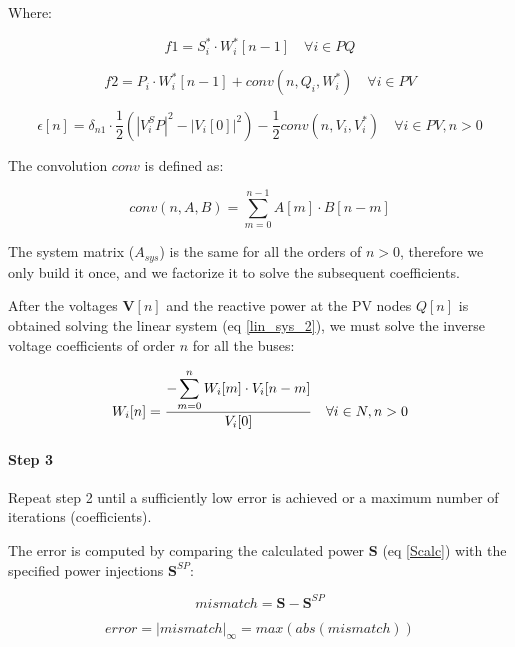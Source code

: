 \documentclass[a4paper,twoside,fleqn]{tufte-book}
\begin{document}
Where:

\begin{equation}
f1 = S^*_i \cdot W^*_i[n-1] \quad \forall i \in PQ
\end{equation}

\begin{equation}
f2 = P_i \cdot W^*_i[n-1] + conv(n, Q_i, W^*_i) \quad \forall i \in PV
\end{equation}

\begin{equation}
\epsilon[n] = \delta_{n1} \cdot \frac{1}{2} \left(|V_i^SP|^2 - |V_i[0]|^2\right) - \frac{1}{2} conv(n, V_i, V_i^*)  \quad \forall i \in PV, n > 0
\end{equation}

The convolution $conv$ is defined as:

\begin{equation}
conv(n, A, B) = \sum_{m=0}^{n-1} A[m] \cdot B[n-m]
\end{equation}

The system matrix ($A_{sys}$) is the same for all the orders of $n>0$, therefore we only build it once, and we factorize it to solve the subsequent coefficients.

After the voltages $\textbf{V}[n]$ and the reactive power at the PV nodes $Q[n]$ is obtained solving the linear system (eq \ref{lin_sys_2}), we must solve the inverse voltage coefficients of order $n$ for all the buses:

\begin{equation}
W_i[n] = \frac{- \mathlarger{\sum_{m=0}^{n}W_i[m] \cdot V_i[n-m]} }{V_i[0]} \quad  \forall i \in N, n>0
\end{equation}


\paragraph{Step 3}

Repeat step 2 until a sufficiently low error is achieved or a maximum number of iterations (coefficients).


The error is computed by comparing the calculated power $\textbf{S}$ (eq \ref{Scalc}) with the specified power injections $\textbf{S}^{SP}$:

\begin{equation}
mismatch = \textbf{S} - \textbf{S}^{SP}
\end{equation}

\begin{equation}
error = |mismatch|_\infty = max(abs(mismatch))
\end{equation}
\end{document}
